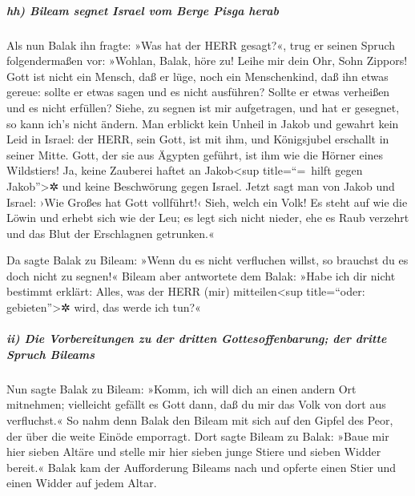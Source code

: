 \hypertarget{hh-bileam-segnet-israel-vom-berge-pisga-herab}{%
\subparagraph{hh) Bileam segnet Israel vom Berge Pisga
herab}\label{hh-bileam-segnet-israel-vom-berge-pisga-herab}}

Als nun Balak ihn fragte: »Was hat der HERR gesagt?«,
trug er seinen Spruch folgendermaßen vor: »Wohlan, Balak, höre zu! Leihe
mir dein Ohr, Sohn Zippors! Gott ist nicht ein Mensch,
daß er lüge, noch ein Menschenkind, daß ihn etwas gereue: sollte er
etwas sagen und es nicht ausführen? Sollte er etwas verheißen und es
nicht erfüllen? Siehe, zu segnen ist mir aufgetragen, und
hat er gesegnet, so kann ich's nicht ändern. Man erblickt
kein Unheil in Jakob und gewahrt kein Leid in Israel: der HERR, sein
Gott, ist mit ihm, und Königsjubel erschallt in seiner Mitte.
Gott, der sie aus Ägypten geführt, ist ihm wie die Hörner
eines Wildstiers! Ja, keine Zauberei haftet an
Jakob\textless sup title=``=~hilft gegen Jakob''\textgreater✲ und keine
Beschwörung gegen Israel. Jetzt sagt man von Jakob und Israel: ›Wie
Großes hat Gott vollführt!‹ Sieh, welch ein Volk! Es
steht auf wie die Löwin und erhebt sich wie der Leu; es legt sich nicht
nieder, ehe es Raub verzehrt und das Blut der Erschlagnen getrunken.«

Da sagte Balak zu Bileam: »Wenn du es nicht verfluchen
willst, so brauchst du es doch nicht zu segnen!« Bileam
aber antwortete dem Balak: »Habe ich dir nicht bestimmt erklärt: Alles,
was der HERR (mir) mitteilen\textless sup title=``oder:
gebieten''\textgreater✲ wird, das werde ich tun?«

\hypertarget{ii-die-vorbereitungen-zu-der-dritten-gottesoffenbarung-der-dritte-spruch-bileams}{%
\subparagraph{ii) Die Vorbereitungen zu der dritten Gottesoffenbarung;
der dritte Spruch
Bileams}\label{ii-die-vorbereitungen-zu-der-dritten-gottesoffenbarung-der-dritte-spruch-bileams}}

Nun sagte Balak zu Bileam: »Komm, ich will dich an einen
andern Ort mitnehmen; vielleicht gefällt es Gott dann, daß du mir das
Volk von dort aus verfluchst.« So nahm denn Balak den
Bileam mit sich auf den Gipfel des Peor, der über die weite Einöde
emporragt. Dort sagte Bileam zu Balak: »Baue mir hier
sieben Altäre und stelle mir hier sieben junge Stiere und sieben Widder
bereit.« Balak kam der Aufforderung Bileams nach und
opferte einen Stier und einen Widder auf jedem Altar.

